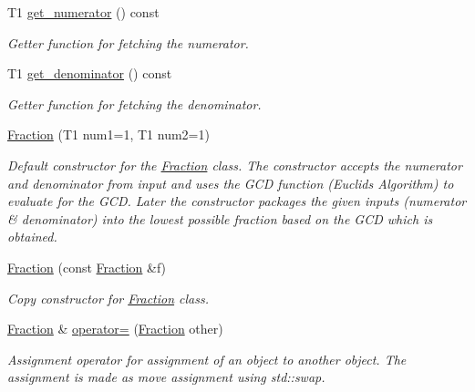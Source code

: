 \begin{DoxyCompactItemize}
\item 
\mbox{\label{class_fraction_a9e76a64248f65036ce4c42e11b97f668}} 
T1 \mbox{\hyperlink{class_fraction_a9e76a64248f65036ce4c42e11b97f668}{get\+\_\+numerator}} () const
\begin{DoxyCompactList}\small\item\em Getter function for fetching the numerator. \end{DoxyCompactList}\item 
\mbox{\label{class_fraction_acaa8644d13c8aca0608a7480380f0f26}} 
T1 \mbox{\hyperlink{class_fraction_acaa8644d13c8aca0608a7480380f0f26}{get\+\_\+denominator}} () const
\begin{DoxyCompactList}\small\item\em Getter function for fetching the denominator. \end{DoxyCompactList}\item 
\mbox{\hyperlink{class_fraction_a666b7a3b88063964ce1d9330b85a65ac}{Fraction}} (T1 num1=1, T1 num2=1)
\begin{DoxyCompactList}\small\item\em Default constructor for the \mbox{\hyperlink{class_fraction}{Fraction}} class. The constructor accepts the numerator and denominator from input and uses the G\+CD function (Euclid\textquotesingle{}s Algorithm) to evaluate for the G\+CD. Later the constructor packages the given inputs (numerator \& denominator) into the lowest possible fraction based on the G\+CD which is obtained. \end{DoxyCompactList}\item 
\mbox{\hyperlink{class_fraction_af8e21ec54ed1bbbb929cdad09b8d67e1}{Fraction}} (const \mbox{\hyperlink{class_fraction}{Fraction}} \&f)
\begin{DoxyCompactList}\small\item\em Copy constructor for \mbox{\hyperlink{class_fraction}{Fraction}} class. \end{DoxyCompactList}\item 
\mbox{\hyperlink{class_fraction}{Fraction}} \& \mbox{\hyperlink{class_fraction_aa1f6ad93978f3dc5b403a568070099c6}{operator=}} (\mbox{\hyperlink{class_fraction}{Fraction}} other)
\begin{DoxyCompactList}\small\item\em Assignment operator for assignment of an object to another object. The assignment is made as move assignment using std\+::swap. \end{DoxyCompactList}\item 

\end{DoxyCompactItemize}
